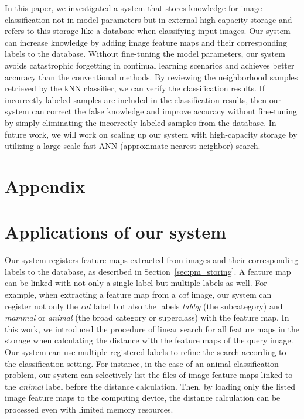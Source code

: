 \documentclass[runningheads]{llncs}
\begin{document}
In this paper, we investigated a system that stores knowledge for image classification not in model parameters but in external high-capacity storage
and refers to this storage like a database when classifying input images.
Our system can increase knowledge by adding image feature maps and their corresponding labels to the database.
Without fine-tuning the model parameters, our system avoids catastrophic forgetting in continual learning scenarios
and achieves better accuracy than the conventional methods.
By reviewing the neighborhood samples retrieved by the kNN classifier, we can verify the classification results.
If incorrectly labeled samples are included in the classification results,
then our system can correct the false knowledge and improve accuracy without fine-tuning by simply eliminating the incorrectly labeled samples from the database.
In future work, we will work on scaling up our system with high-capacity storage
by utilizing a large-scale fast ANN (approximate nearest neighbor) search.


\clearpage




\newpage

\appendix

\section*{Appendix}

\section{Applications of our system}
Our system registers feature maps extracted from images and their corresponding labels to the database, as described in Section~\ref{sec:pm_storing}.
A feature map can be linked with not only a single label but multiple labels as well.
For example, when extracting a feature map from a \textit{cat} image, our system can register
not only the \textit{cat} label but also the labels \textit{tabby} (the subcategory) and \textit{mammal} or \textit{animal}
(the broad category or superclass) with the feature map.
In this work, we introduced the procedure of linear search for all feature maps in the storage
when calculating the distance with the feature maps of the query image.
Our system can use multiple registered labels to refine the search according to the classification setting.
For instance, in the case of an animal classification problem, our system can selectively list
the files of image feature maps linked to the \textit{animal} label before the distance calculation.
Then, by loading only the listed image feature maps to the computing device,
the distance calculation can be processed even with limited memory resources.
\end{document}
